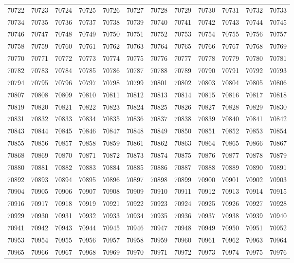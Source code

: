 \begin{center}
\begin{longtable}{llllllllllll}
70722 &70723 &70724 &70725 &70726 &70727 &70728 &70729 &70730 &70731 &70732 &70733 \\
70734 &70735 &70736 &70737 &70738 &70739 &70740 &70741 &70742 &70743 &70744 &70745 \\
70746 &70747 &70748 &70749 &70750 &70751 &70752 &70753 &70754 &70755 &70756 &70757 \\
70758 &70759 &70760 &70761 &70762 &70763 &70764 &70765 &70766 &70767 &70768 &70769 \\
70770 &70771 &70772 &70773 &70774 &70775 &70776 &70777 &70778 &70779 &70780 &70781 \\
70782 &70783 &70784 &70785 &70786 &70787 &70788 &70789 &70790 &70791 &70792 &70793 \\
70794 &70795 &70796 &70797 &70798 &70799 &70801 &70802 &70803 &70804 &70805 &70806 \\
70807 &70808 &70809 &70810 &70811 &70812 &70813 &70814 &70815 &70816 &70817 &70818 \\
70819 &70820 &70821 &70822 &70823 &70824 &70825 &70826 &70827 &70828 &70829 &70830 \\
70831 &70832 &70833 &70834 &70835 &70836 &70837 &70838 &70839 &70840 &70841 &70842 \\
70843 &70844 &70845 &70846 &70847 &70848 &70849 &70850 &70851 &70852 &70853 &70854 \\
70855 &70856 &70857 &70858 &70859 &70861 &70862 &70863 &70864 &70865 &70866 &70867 \\
70868 &70869 &70870 &70871 &70872 &70873 &70874 &70875 &70876 &70877 &70878 &70879 \\
70880 &70881 &70882 &70883 &70884 &70885 &70886 &70887 &70888 &70889 &70890 &70891 \\
70892 &70893 &70894 &70895 &70896 &70897 &70898 &70899 &70900 &70901 &70902 &70903 \\
70904 &70905 &70906 &70907 &70908 &70909 &70910 &70911 &70912 &70913 &70914 &70915 \\
70916 &70917 &70918 &70919 &70921 &70922 &70923 &70924 &70925 &70926 &70927 &70928 \\
70929 &70930 &70931 &70932 &70933 &70934 &70935 &70936 &70937 &70938 &70939 &70940 \\
70941 &70942 &70943 &70944 &70945 &70946 &70947 &70948 &70949 &70950 &70951 &70952 \\
70953 &70954 &70955 &70956 &70957 &70958 &70959 &70960 &70961 &70962 &70963 &70964 \\
70965 &70966 &70967 &70968 &70969 &70970 &70971 &70972 &70973 &70974 &70975 &70976 \\

\end{longtable}
\end{center}
